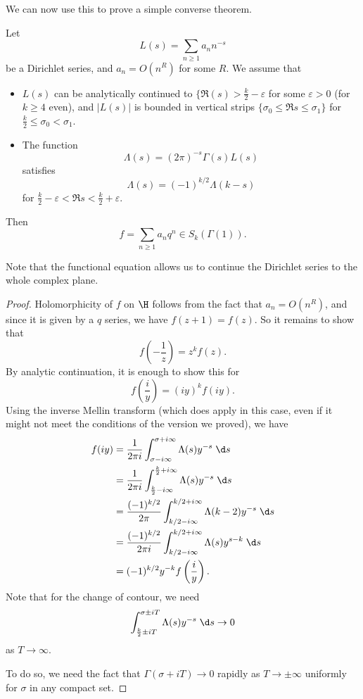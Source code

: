 \documentclass[a4paper]{article}
\begin{document}
We can now use this to prove a simple converse theorem.
\begin{thm}
  Let
  \[
    L(s) = \sum_{n \geq 1} a_n n^{-s}
  \]
  be a Dirichlet series, and $a_n = O(n^R)$ for some $R$. We assume that
  \begin{itemize}
    \item $L(s)$ can be analytically continued to $\{\Re(s) > \frac{k}{2} - \varepsilon$ for some $\varepsilon > 0$ (for $k \geq 4$ even), and $|L(s)|$ is bounded in vertical strips $\{\sigma_0 \leq \Re s \leq \sigma_1\}$ for $\frac{k}{2} \leq \sigma_0 < \sigma_1$.
    \item The function
      \[
        \Lambda(s) = (2\pi)^{-s} \Gamma(s) L(s)
      \]
      satisfies
      \[
        \Lambda(s) = (-1)^{k/2} \Lambda(k - s)
      \]
      for $\frac{k}{2} - \varepsilon < \Re s < \frac{k}{2} + \varepsilon$.
  \end{itemize}
  Then
  \[
    f = \sum_{n \geq 1} a_n q^n \in S_k(\Gamma(1)).
  \]
\end{thm}
Note that the functional equation allows us to continue the Dirichlet series to the whole complex plane.

\begin{proof}
  Holomorphicity of $f$ on $\H$ follows from the fact that $a_n = O(n^R)$, and since it is given by a $q$ series, we have $f(z + 1) = f(z)$. So it remains to show that
  \[
    f\left(-\frac{1}{z}\right) = z^k f(z).
  \]
  By analytic continuation, it is enough to show this for
  \[
    f\left(\frac{i}{y}\right) = (iy)^k f(iy).
  \]
  Using the inverse Mellin transform (which does apply in this case, even if it might not meet the conditions of the version we proved), we have
  \begin{align*}
    f(iy) &= \frac{1}{2\pi i} \int_{\sigma - i \infty}^{\sigma + i \infty} \Lambda(s) y^{-s}\;\d s \\
    &= \frac{1}{2\pi i} \int_{\frac{k}{2} - i \infty}^{\frac{k}{2} + i \infty} \Lambda(s) y^{-s}\;\d s\\
    &= \frac{(-1)^{k/2}}{2\pi} \int_{k/2 - i\infty}^{k/2 + i \infty} \Lambda(k - 2) y^{-s}\;\d s\\
    &= \frac{(-1)^{k/2}}{2\pi i}\int_{k/2 - i\infty}^{k/2 + i\infty} \Lambda(s) y^{s - k}\;\d s\\
    &= (-1)^{k/2} y^{-k}f\left(\frac{i}{y}\right).
  \end{align*}
  Note that for the change of contour, we need
  \[
    \int_{\frac{k}{2} \pm iT }^{\sigma \pm iT} \Lambda(s) y^{-s}\;\d s \to 0
  \]
  as $T \to \infty$.

  To do so, we need the fact that $\Gamma(\sigma + iT) \to 0$ rapidly as $T \to \pm \infty$ uniformly for $\sigma$ in any compact set.
\end{proof}
\end{document}
